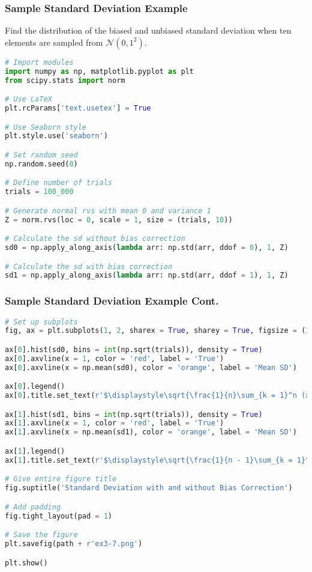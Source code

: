 \documentclass{beamer}
\begin{document}
\begin{frame}[fragile]
\frametitle{Sample Standard Deviation Example}
\small 
\begin{Example}
Find the distribution of the biased and unbiased standard deviation when ten elements are sampled from $\mathcal{N}(0, 1^2)$.
\end{Example}

\begin{lstlisting}[language=Python]
# Import modules
import numpy as np, matplotlib.pyplot as plt
from scipy.stats import norm

# Use LaTeX
plt.rcParams['text.usetex'] = True

# Use Seaborn style
plt.style.use('seaborn')

# Set random seed
np.random.seed(0)

# Define number of trials
trials = 100_000

# Generate normal rvs with mean 0 and variance 1
Z = norm.rvs(loc = 0, scale = 1, size = (trials, 10))

# Calculate the sd without bias correction
sd0 = np.apply_along_axis(lambda arr: np.std(arr, ddof = 0), 1, Z)

# Calculate the sd with bias correction
sd1 = np.apply_along_axis(lambda arr: np.std(arr, ddof = 1), 1, Z)
\end{lstlisting}


\end{frame}

\begin{frame}[fragile]
\frametitle{Sample Standard Deviation Example Cont.}

\begin{lstlisting}[language=Python]
# Set up subplots
fig, ax = plt.subplots(1, 2, sharex = True, sharey = True, figsize = (15, 5))

ax[0].hist(sd0, bins = int(np.sqrt(trials)), density = True)
ax[0].axvline(x = 1, color = 'red', label = 'True')
ax[0].axvline(x = np.mean(sd0), color = 'orange', label = 'Mean SD')

ax[0].legend()
ax[0].title.set_text(r'$\displaystyle\sqrt{\frac{1}{n}\sum_{k = 1}^n (x_k - \bar{x})^2}$')

ax[1].hist(sd1, bins = int(np.sqrt(trials)), density = True)
ax[1].axvline(x = 1, color = 'red', label = 'True')
ax[1].axvline(x = np.mean(sd1), color = 'orange', label = 'Mean SD')

ax[1].legend()
ax[1].title.set_text(r'$\displaystyle\sqrt{\frac{1}{n - 1}\sum_{k = 1}^n (x_k - \bar{x})^2}$')

# Give entire figure title
fig.suptitle('Standard Deviation with and without Bias Correction')

# Add padding
fig.tight_layout(pad = 1)

# Save the figure
plt.savefig(path + r'ex3-7.png')

plt.show()
\end{lstlisting}

\end{frame}
\end{document}
